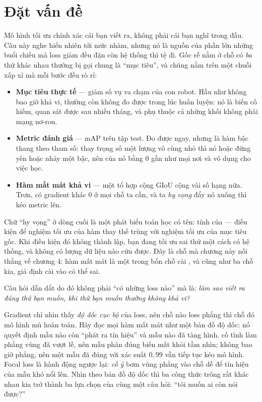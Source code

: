 \documentclass[../../deep_learning.tex]{subfiles}
\begin{document}
\section{Đặt vấn đề}

Mô hình tối ưu chính xác cái bạn viết ra, không phải cái bạn nghĩ trong đầu. Câu này nghe hiển nhiên tới mức nhàm, nhưng nó là nguồn của phần lớn những buổi chiều mà loss giảm đều đặn còn hệ thống thì tệ đi. Gốc rễ nằm ở chỗ có \emph{ba} thứ khác nhau thường bị gọi chung là ``mục tiêu'', và chúng nằm trên một chuỗi xấp xỉ mà mỗi bước đều rò rỉ:

\begin{itemize}
\item \textbf{Mục tiêu thực tế} --- giảm số vụ va chạm của con robot. Hầu như không bao giờ khả vi, thường còn không đo được trong lúc huấn luyện: nó là biến cố hiếm, quan sát được sau nhiều tháng, và phụ thuộc cả những khối không phải mạng nơ-ron.
\item \textbf{Metric đánh giá} --- mAP trên tập test. Đo được ngay, nhưng là hàm bậc thang theo tham số: thay trọng số một lượng vô cùng nhỏ thì nó hoặc đứng yên hoặc nhảy một bậc, nên  của nó bằng 0 gần như mọi nơi và vô dụng cho việc học.
\item \textbf{Hàm mất mát khả vi} --- một tổ hợp  cộng GIoU cộng vài số hạng nữa. Trơn, có gradient khác 0 ở mọi chỗ ta cần, và ta \emph{hy vọng} đẩy nó xuống thì kéo metric lên.
\end{itemize}

Chữ ``hy vọng'' ở dòng cuối là một phát biểu toán học có tên: tính  của  --- điều kiện để nghiệm tối ưu của hàm thay thế trùng với nghiệm tối ưu của mục tiêu gốc. Khi điều kiện đó không thành lập, bạn đang tối ưu sai thứ một cách có hệ thống, và không có lượng dữ liệu nào cứu được. Đây là chỗ mà chương này nối thẳng về chương 4: hàm mất mát là một trong bốn chỗ cài , và cũng như ba chỗ kia, giả định cài vào có thể sai.

Câu hỏi dẫn dắt do đó không phải ``có những loss nào'' mà là: \emph{làm sao viết ra đúng thứ bạn muốn, khi thứ bạn muốn thường không khả vi?}

\begin{trucgiac}
Gradient chỉ nhìn thấy \emph{độ dốc cục bộ} của loss, nên chỗ nào loss phẳng thì chỗ đó mô hình mù hoàn toàn. Hãy đọc mọi hàm mất mát như một bản đồ độ dốc: nó quyết định mẫu nào còn ``phát ra tín hiệu'' và mẫu nào đã tàng hình.  cố tình làm phẳng vùng đã vượt lề, nên mẫu phân đúng biến mất khỏi tầm nhìn;  không bao giờ phẳng, nên một mẫu đã đúng với xác suất \(0{,}99\) vẫn tiếp tục kéo mô hình. Focal loss là hành động ngược lại: \emph{cố ý} bơm vùng phẳng vào chỗ dễ để tín hiệu của mẫu khó nổi lên. Nhìn theo bản đồ độ dốc thì ba công thức trông rất khác nhau kia trở thành ba lựa chọn của cùng một câu hỏi: ``tôi muốn ai còn nói được?''
\end{trucgiac}
\end{document}
